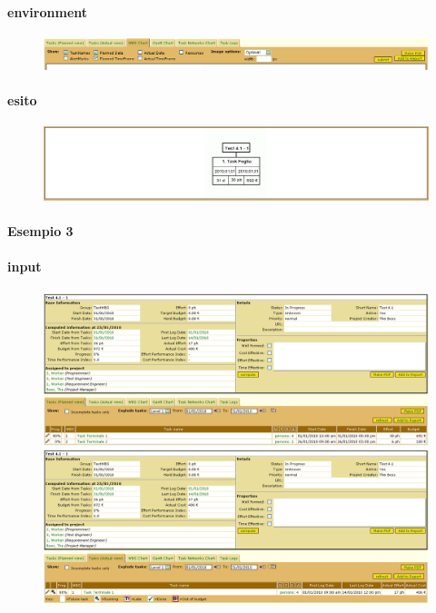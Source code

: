 \paragraph{environment}
\begin{figure}
\centering
\includegraphics[width=\textwidth]{tests/TEST_WBS/4.1/4.1_1/Esempio_2/environment.png}
\end{figure}
\paragraph{esito}
\begin{figure}
\centering
\includegraphics[width=\textwidth]{tests/TEST_WBS/4.1/4.1_1/Esempio_2/output.png}
\end{figure}

\paragraph{Esempio 3}
\paragraph{input}
\begin{figure}
\centering
\includegraphics[width=\textwidth]{tests/TEST_WBS/4.1/4.1_1/Esempio_3/input.png}
\includegraphics[width=\textwidth]{tests/TEST_WBS/4.1/4.1_1/Esempio_3/input_actual.png}
\end{figure}
